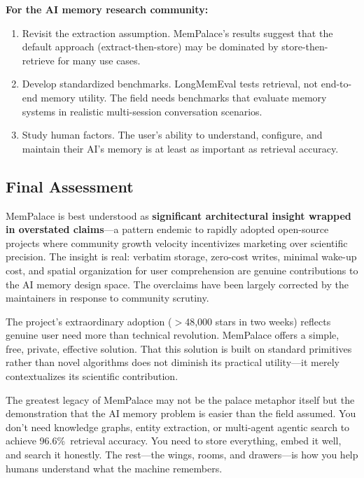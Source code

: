 \documentclass[twoside,11pt]{article}
\begin{document}
\textbf{For the AI memory research community:}
\begin{enumerate}[leftmargin=*, label=\arabic*.]
\item Revisit the extraction assumption.  MemPalace's results suggest that the
  default approach (extract-then-store) may be dominated by store-then-retrieve
  for many use cases.
\item Develop standardized benchmarks.  LongMemEval tests retrieval, not
  end-to-end memory utility.  The field needs benchmarks that evaluate memory
  systems in realistic multi-session conversation scenarios.
\item Study human factors.  The user's ability to understand, configure, and
  maintain their AI's memory is at least as important as retrieval accuracy.
\end{enumerate}

\subsection{Final Assessment}

MemPalace is best understood as \textbf{significant architectural insight
wrapped in overstated claims}---a pattern endemic to rapidly adopted
open-source projects where community growth velocity incentivizes marketing
over scientific precision.  The insight is real: verbatim storage, zero-cost
writes, minimal wake-up cost, and spatial organization for user comprehension
are genuine contributions to the AI memory design space.  The overclaims have
been largely corrected by the maintainers in response to community scrutiny.

The project's extraordinary adoption ($>$48{,}000 stars in two weeks) reflects
genuine user need more than technical revolution.  MemPalace offers a simple,
free, private, effective solution.  That this solution is built on standard
primitives rather than novel algorithms does not diminish its practical
utility---it merely contextualizes its scientific contribution.

The greatest legacy of MemPalace may not be the palace metaphor itself but the
demonstration that the AI memory problem is easier than the field assumed.  You
don't need knowledge graphs, entity extraction, or multi-agent agentic search
to achieve 96.6\%\ retrieval accuracy.  You need to store everything, embed it
well, and search it honestly.  The rest---the wings, rooms, and
drawers---is how you help humans understand what the machine remembers.
\end{document}
